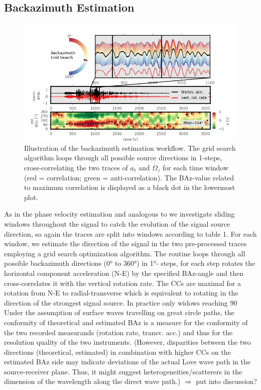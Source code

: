 \documentclass[12pt,reqno]{article} %
\begin{document}
\subsection{Backazimuth Estimation}
\begin{figure}[!htp]
\centering
\includegraphics[width=\textwidth]{pp_Baz_paperready.png}
\caption{Illustration of the backazimuth estimation workflow. The grid search algorithm loops through all possible source directions in 1\textdegree -steps, cross-correlating the two traces of $a_t$ and $\dot{\Omega_z}$ for each time window (red = correlation; green = anti-correlation). The BAz-value related to maximum correlation is displayed as a black dot in the lowermost plot.}
\label{fig:stretchmar}
\end{figure}
As in the phase velocity estimation and analogous to \cite{Igel2007} we investigate sliding windows throughout the signal to catch the evolution of the signal source direction, so again the traces are split into windows according to table 1. 
For each window, we estimate the direction of the signal in the two pre-processed traces employing a grid search optimization algorithm. The routine loops through all possible backazimuth directions (0° to 360°) in 1°- steps, for each step rotates the horizontal component acceleration (N-E) by the specified BAz-angle and then cross-correlates it with the vertical rotation rate. The CCs are maximal for a rotation from N-E to radial-transverse which is equivalent to rotating in the direction of the strongest signal source. In practice only widows reaching 90%
Under the assumption of surface waves travelling on great circle paths, the conformity of theoretical and estimated BAz is a measure for the conformity of the two recorded measurands (rotation rate, transv. acc.) and thus for the resolution quality of the two instruments. (However, disparities between the two directions (theoretical, estimated) in combination with higher CCs on the estimated BAz side may indicate deviations of the actual Love wave path in the source-receiver plane. Thus, it might suggest heterogeneities/scatterers in the dimension of the wavelength along the direct wave path.) $\Rightarrow$ put into discussion?\\
\end{document}
